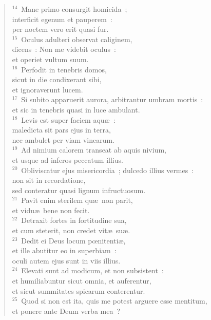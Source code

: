 \begin{flushleft}
\begin{verse}
${}^{14}$~Mane primo consurgit homicida~;\\ interficit egenum et pauperem~:\\ per noctem vero erit quasi fur.\\
${}^{15}$~Oculus adulteri observat caliginem,\\ dicens~: Non me videbit oculus~:\\ et operiet vultum suum.\\
${}^{16}$~Perfodit in tenebris domos,\\ sicut in die condixerant sibi,\\ et ignoraverunt lucem.\\
${}^{17}$~Si subito apparuerit aurora, arbitrantur umbram mortis~:\\ et sic in tenebris quasi in luce ambulant.\\
${}^{18}$~Levis est super faciem aqu\ae~:\\ maledicta sit pars ejus in terra,\\ nec ambulet per viam vinearum.\\
${}^{19}$~Ad nimium calorem transeat ab aquis nivium,\\ et usque ad inferos peccatum illius.\\
${}^{20}$~Obliviscatur ejus misericordia~; dulcedo illius vermes~:\\ non sit in recordatione,\\ sed conteratur quasi lignum infructuosum.\\
${}^{21}$~Pavit enim sterilem qu\ae\ non parit,\\ et vidu\ae\ bene non fecit.\\
${}^{22}$~Detraxit fortes in fortitudine sua,\\ et cum steterit, non credet vit\ae\ su\ae .\\
${}^{23}$~Dedit ei Deus locum pœnitenti\ae ,\\ et ille abutitur eo in superbiam~:\\ oculi autem ejus sunt in viis illius.\\
${}^{24}$~Elevati sunt ad modicum, et non subsistent~:\\ et humiliabuntur sicut omnia, et auferentur,\\ et sicut summitates spicarum conterentur.\\
${}^{25}$~Quod si non est ita, quis me potest arguere esse mentitum,\\ et ponere ante Deum verba mea~?\end{verse}\end{flushleft}



